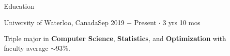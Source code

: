 \documentclass{resume}
\begin{document}

\begin{rSection}{Education}

    \begin{rSubsection}{University of Waterloo, Canada}{Sep 2019 \(-\) Present \(\cdot\) 3 yrs 10 mos}{}{}
        \item Triple major in \textbf{Computer Science}, \textbf{Statistics}, and \textbf{Optimization} with faculty average \(\sim\)93\%.
    \end{rSubsection}

\end{rSection}
\end{document}
